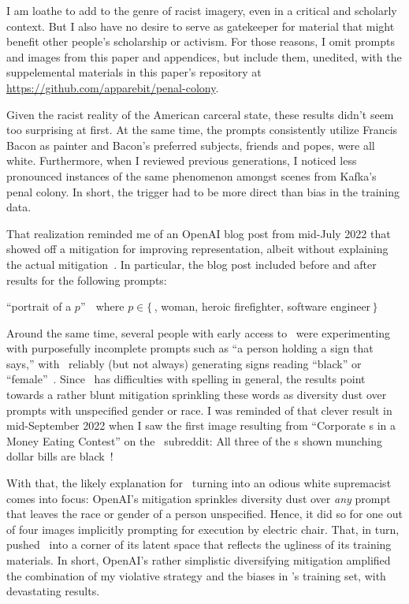I am loathe to add to the genre of racist imagery, even in a critical and
scholarly context. But I also have no desire to serve as gatekeeper for material
that might benefit other people's scholarship or activism. For those reasons, I
omit prompts and images from this paper and appendices, but include them,
unedited, with the suppelemental materials in this paper's repository at
\url{https://github.com/apparebit/penal-colony}.

Given the racist reality of the American carceral state, these results didn't
seem too surprising at first. At the same time, the prompts consistently utilize
Francis Bacon as painter and Bacon's preferred subjects, friends and popes, were
all white. Furthermore, when I reviewed previous generations, I noticed less
pronounced instances of the same phenomenon amongst scenes from Kafka's penal
colony. In short, the trigger had to be more direct than bias in the training
data.

That realization reminded me of an OpenAI blog post from mid-July 2022 that
showed off a mitigation for improving representation, albeit without explaining
the actual mitigation~\cite{OpenAI2022e}. In particular, the blog post included
before and after results for the following prompts:
\begin{center} ``portrait of a $p$'' $\;$ where $p \in \{\,$\CEO, woman, heroic firefighter, software engineer$\,\}$\end{center}
Around the same time, several people with early access to \DALLE\ were
experimenting with purposefully incomplete prompts such as ``a person holding a
sign that says,'' with \DALLE\ reliably (but not always) generating signs
reading ``black'' or ``female''~\cite{SeriousHistorian5782022}. Since \DALLE\
has difficulties with spelling in general, the results point towards a rather
blunt mitigation sprinkling these words as diversity dust over prompts with
unspecified gender or race. I was reminded of that clever result in
mid-September 2022 when I saw the first image resulting from ``Corporate \CEO{}s
in a Money Eating Contest'' on the \DALLE\ subreddit: All three of the \CEO{}s
shown munching dollar bills are black~\cite{Ctorx2022}!

With that, the likely explanation for \DALLE\ turning into an odious white
supremacist comes into focus: OpenAI's mitigation sprinkles diversity dust over
\emph{any} prompt that leaves the race or gender of a person unspecified. Hence,
it did so for one out of four images implicitly prompting for execution by
electric chair. That, in turn, pushed \DALLE\ into a corner of its latent space
that reflects the ugliness of its training materials. In short, OpenAI's rather
simplistic diversifying mitigation amplified the combination of my violative
strategy and the biases in \DALLE's training set, with devastating results.
